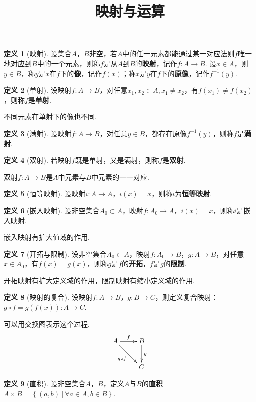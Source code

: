 \documentclass[12pt]{ctexart}
\title{\vspace{-2em}\textbf{映射与运算}\vspace{-2em}}
\date{ }
\theoremstyle{definition}
\newtheorem{definition}{定义}
\theoremstyle{plain}
\begin{document}
	\maketitle
	\begin{definition}[映射]
		设集合$A$，$B$非空，若$A$中的任一元素都能通过某一对应法则$f$唯一地对应到$B$中的一个元素，则称$f$是从$A$到$B$的\textbf{映射}，记作$f:A\to B$. 设$x\in A$，则$y\in B$，称$y$是$x$在$f$下的\textbf{像}，记作$f(x)$；称$x$是$y$在$f$下的\textbf{原像}，记作$f^{-1}(y)$.
	\end{definition}
	\begin{definition}[单射]
		设映射$f:A\to B$，对任意$x_1,x_2\in A,x_1\neq x_2$，有$f(x_1)\neq f(x_2)$，则称$f$是\textbf{单射}.
	\end{definition}
	不同元素在单射下的像也不同.
	\begin{definition}[满射]
		设映射$f:A\to B$，对任意$y\in B$，都存在原像$f^{-1}(y)$，则称$f$是\textbf{满射}.
	\end{definition}
	\begin{definition}[双射]
		若映射$f$既是单射，又是满射，则称$f$是\textbf{双射}.
	\end{definition}
	双射$f:A\to B$是$A$中元素与$B$中元素的一一对应.
	\begin{definition}[恒等映射]
		设映射$i:A\to A$，$i(x)=x$，则称$i$为\textbf{恒等映射}.
	\end{definition}
	\begin{definition}[嵌入映射]
		设非空集合$A_0\subset A$，映射$f:A_0\to A$，$i(x)=x$，则称$i$是嵌入映射.
	\end{definition}
	嵌入映射有扩大值域的作用.
	\begin{definition}[开拓与限制]
		设非空集合$A_0\subset A$，映射$f:A_0\to B$，$g:A\to B$，对任意$x\in A_0$，有$f(x)=g(x)$，则称$g$是$f$的\textbf{开拓}，$f$是$g$的\textbf{限制}.
	\end{definition}
	开拓映射有扩大定义域的作用，限制映射有缩小定义域的作用.
	\begin{definition}[映射的复合]
		设映射$f:A\to B$，$g:B\to C$，则定义复合映射：$g\circ f=g\left(f\left(x\right)\right):A\to C$.
	\end{definition}
	可以用交换图表示这个过程.
	\begin{displaymath}
		\xymatrix{
		A\ar[r]^f \ar[dr]_{g\circ f} & B\ar[d]^g\\
									 & C\\
		}
	\end{displaymath}
	\begin{definition}[直积]
		设非空集合$A$，$B$，定义$A$与$B$的\textbf{直积}$A\times B=\left\{(a,b)\ |\ \forall a\in A,b\in B\right\}$.
	\end{definition}
\end{document}
